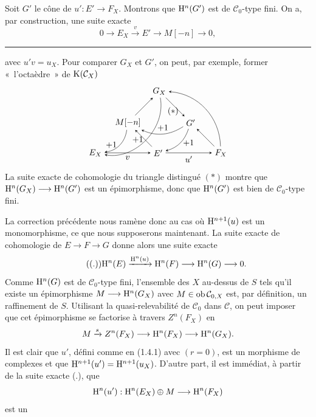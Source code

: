 \documentclass[11pt]{article}
\begin{document}
Soit \(G'\) le cône de \(u':E'\to F_X\). Montrons que \(\mathrm H^n(G')\) est de \(\mathcal C_0\)-type fini. On a, par construction, une suite exacte
\[
  0\longrightarrow E_X\xrightarrow{v}E'\longrightarrow M[-n]\longrightarrow 0,
\]


\medskip\hrule\medskip

avec \(u'v=u_X\). Pour comparer \(G_X\) et \(G'\), on peut, par exemple, former «~l'octaèdre~» de \(\mathrm K(\mathcal C_X)\)
\[
\begin{tikzpicture}[>=stealth,baseline=(GX.base),node distance=1.0cm]
  \node (EX) at (0,0) {$E_X$};
  \node (Ep) at (2.6,0) {$E'$};
  \node (FX) at (5.2,0) {$F_X$};
  \node (M)  at (1.35,1.25) {$M[-n]$};
  \node (GX) at (2.65,2.55) {$G_X$};
  \node (Gp) at (3.95,1.25) {$G'$};
  \node at (3.22,1.72) {$(*)$};
  \draw[->] (EX) -- node[below] {$v$} (Ep);
  \draw[->] (Ep) -- node[below] {$u'$} (FX);
  \draw[->] (Ep) -- (M);
  \draw[->] (M) -- (GX);
  \draw[->] (GX) -- (Gp);
  \draw[->] (FX) -- (Gp);
  \draw[->] (M) to[bend left=38] node[left] {$+1$} (EX);
  \draw[->] (Gp) to[bend left=28] node[above] {$+1$} (M);
  \draw[->] (Gp) to[bend left=28] node[right] {$+1$} (Ep);
  \draw[->] (GX) to[bend left=55] node[left] {$+1$} (EX);
  \draw[->] (FX) to[bend right=42] (GX);
\end{tikzpicture}
\]
La suite exacte de cohomologie du triangle distingué \((*)\) montre que \(\mathrm H^n(G_X)\longrightarrow \mathrm H^n(G')\) est un épimorphisme, donc que \(\mathrm H^n(G')\) est bien de \(\mathcal C_0\)-type fini.

La correction précédente nous ramène donc au cas où \(\mathrm H^{n+1}(u)\) est un monomorphisme, ce que nous supposerons maintenant. La suite exacte de cohomologie de \(E\to F\to G\) donne alors une suite exacte
\begin{equation}\tag{(.)}
  \mathrm H^n(E)\xrightarrow{\mathrm H^n(u)}
  \mathrm H^n(F)\longrightarrow \mathrm H^n(G)\longrightarrow 0.
\end{equation}
Comme \(\mathrm H^n(G)\) est de \(\mathcal C_0\)-type fini, l'ensemble des \(X\) au-dessus de \(S\) tels qu'il existe un épimorphisme \(M\longrightarrow \mathrm H^n(G_X)\) avec \(M\in\operatorname{ob}\mathcal C_{0,X}\) est, par définition, un raffinement de \(S\). Utilisant la quasi-relevabilité de \(\mathcal C_0\) dans \(\mathcal C\), on peut imposer que cet épimorphisme se factorise à travers \(Z^n(F_X)\) en
\[
  M\xrightarrow{s}Z^n(F_X)\longrightarrow \mathrm H^n(F_X)\longrightarrow \mathrm H^n(G_X).
\]
Il est clair que \(u'\), défini comme en (1.4.1) avec \((r=0)\), est un morphisme de complexes et que \(\mathrm H^{n+1}(u')=\mathrm H^{n+1}(u_X)\). D'autre part, il est immédiat, à partir de la suite exacte (.), que
\[
  \mathrm H^n(u'):\mathrm H^n(E_X)\oplus M\longrightarrow \mathrm H^n(F_X)
\]
est un
\end{document}
